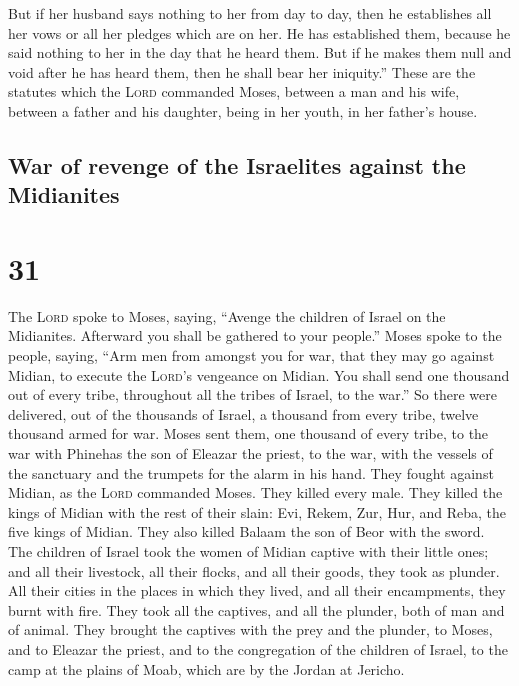  But if her husband says nothing to her from day to day,
then he establishes all her vows or all her pledges which are on her. He
has established them, because he said nothing to her in the day that he
heard them.  But if he makes them null and void after he
has heard them, then he shall bear her iniquity.''  These
are the statutes which the \textsc{Lord} commanded Moses, between a man
and his wife, between a father and his daughter, being in her youth, in
her father's house.

\hypertarget{war-of-revenge-of-the-israelites-against-the-midianites}{%
\subsection{War of revenge of the Israelites against the
Midianites}\label{war-of-revenge-of-the-israelites-against-the-midianites}}

\hypertarget{section-30}{%
\section{31}\label{section-30}}

 The \textsc{Lord} spoke to Moses, saying, 
``Avenge the children of Israel on the Midianites. Afterward you shall
be gathered to your people.''  Moses spoke to the people,
saying, ``Arm men from amongst you for war, that they may go against
Midian, to execute the \textsc{Lord}'s vengeance on Midian.
 You shall send one thousand out of every tribe,
throughout all the tribes of Israel, to the war.''  So
there were delivered, out of the thousands of Israel, a thousand from
every tribe, twelve thousand armed for war.  Moses sent
them, one thousand of every tribe, to the war with Phinehas the son of
Eleazar the priest, to the war, with the vessels of the sanctuary and
the trumpets for the alarm in his hand.  They fought
against Midian, as the \textsc{Lord} commanded Moses. They killed every
male.  They killed the kings of Midian with the rest of
their slain: Evi, Rekem, Zur, Hur, and Reba, the five kings of Midian.
They also killed Balaam the son of Beor with the sword. 
The children of Israel took the women of Midian captive with their
little ones; and all their livestock, all their flocks, and all their
goods, they took as plunder.  All their cities in the
places in which they lived, and all their encampments, they burnt with
fire.  They took all the captives, and all the plunder,
both of man and of animal.  They brought the captives
with the prey and the plunder, to Moses, and to Eleazar the priest, and
to the congregation of the children of Israel, to the camp at the plains
of Moab, which are by the Jordan at Jericho.

